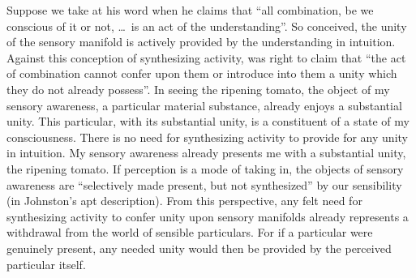 \documentclass[12pt]{article}
\begin{document}
Suppose we take \citet[B130]{Kant:1781fk} at his word when he claims that ``all combination, be we conscious of it or not, \ldots\ is an act of the understanding''. So conceived, the unity of the sensory manifold is actively provided by the understanding in intuition. Against this conception of synthesizing activity, \citet[226]{Prichard:1909yg} was right to claim that ``the act of combination cannot confer upon them or introduce into them a unity which they do not already possess''. In seeing the ripening tomato, the object of my sensory awareness, a particular material substance, already enjoys a substantial unity. This particular, with its substantial unity, is a constituent of a state of my consciousness. There is no need for synthesizing activity to provide for any unity in intuition. My sensory awareness already presents me with a substantial unity, the ripening tomato. If perception is a mode of taking in, the objects of sensory awareness are ``selectively made present, but not synthesized'' by our sensibility (in Johnston's \citeyear[285]{Johnston:2006uq} apt description). From this perspective, any felt need for synthesizing activity to confer unity upon sensory manifolds already represents a withdrawal from the world of sensible particulars. For if a particular were genuinely present, any needed unity would then be provided by the perceived particular itself.
\end{document}
